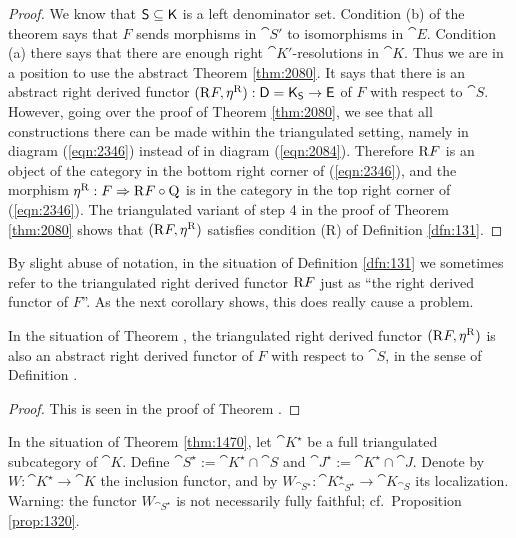 \begin{proof}
We know that $\operatorname{\mathsf{S}} \subseteq \operatorname{\mathsf{K}}$ is a left denominator set.
Condition (b) of the theorem says that $F$ sends morphisms in 
$\cat{S}'$ to isomorphisms in $\cat{E}$. 
Condition (a) there says that there are enough right 
$\cat{K}'$-resolutions in $\cat{K}$.
Thus we are in a position to use the abstract Theorem \ref{thm:2080}.
It says that there is an abstract right derived functor 
$(\mathrm{R} F, \eta^{\mathrm{R}}) : \operatorname{\mathsf{D}} = \operatorname{\mathsf{K}}_{\operatorname{\mathsf{S}}} \to \operatorname{\mathsf{E}}$ 
of $F$ with respect to $\cat{S}$. 
However, going over the proof of Theorem \ref{thm:2080},
we see that all constructions there can be made within the triangulated 
setting, namely in diagram (\ref{eqn:2346}) instead of in  diagram 
(\ref{eqn:2084}). 
Therefore $\mathrm{R} F$ is an object of the category in the 
bottom right corner of (\ref{eqn:2346}), and the morphism 
$\eta^{\mathrm{R}} : F \Rightarrow \mathrm{R} F \circ \operatorname{Q}$
is in the category in the top right corner of (\ref{eqn:2346}).
The triangulated variant of step 4 in the proof of Theorem \ref{thm:2080} 
shows that $(\mathrm{R} F, \eta^{\mathrm{R}})$ satisfies condition (R) of Definition 
\ref{dfn:131}.
\end{proof}

By slight abuse of notation, in the situation of Definition \ref{dfn:131} 
we sometimes refer to the triangulated right derived functor $\mathrm{R} F$
just as ``the right derived functor of $F$''. As the next corollary shows, this 
does really cause a problem. 

\begin{cor} \label{cor:3225}
In the situation of Theorem \tup{\ref{thm:1470}}, the triangulated right 
derived functor $(\mathrm{R} F, \eta^{\mathrm{R}})$ is also an abstract right derived 
functor of $F$ with respect to $\cat{S}$, in the sense of Definition 
\tup{\ref{dfn:2080}}.
\end{cor}

\begin{proof}
This is seen in the proof of Theorem \tup{\ref{thm:1470}}.
\end{proof}

In the situation of Theorem \ref{thm:1470}, let $\cat{K}^{\star}$ be a full 
triangulated subcategory of $\cat{K}$. Define 
$\cat{S}^{\star} := \cat{K}^{\star} \cap \cat{S}$ and 
$\cat{J}^{\star} := \cat{K}^{\star} \cap \cat{J}$. 
Denote by $W : \cat{K}^{\star} \to \cat{K}$
the inclusion functor, and by 
$W_{\cat{S}^{\star}} : \cat{K}^{\star}_{\cat{S}^{\star}} \to \cat{K}_{\cat{S}}$
its localization. 
Warning: the functor $W_{\cat{S}^{\star}}$ is not necessarily fully faithful; 
cf.\ Proposition \ref{prop:1320}. 

